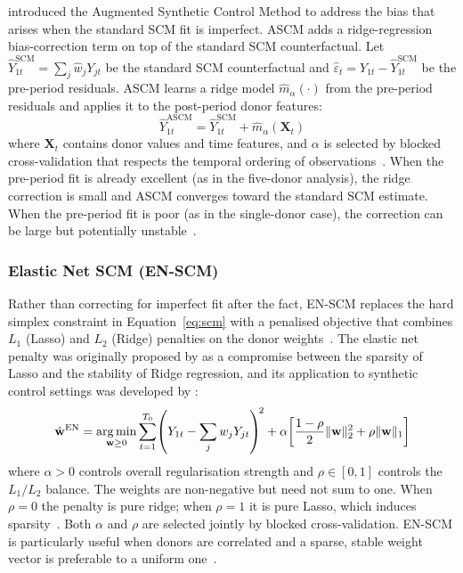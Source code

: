 \textcite{benmichael2021} introduced
the Augmented Synthetic Control Method to address the bias that arises
when the standard SCM fit is imperfect.
ASCM adds a ridge-regression bias-correction term on top of the
standard SCM counterfactual.
Let $\hat{Y}_{1t}^{\text{SCM}} = \sum_j \hat{w}_j Y_{jt}$ be the
standard SCM counterfactual and
$\hat{\varepsilon}_t = Y_{1t} - \hat{Y}_{1t}^{\text{SCM}}$
be the pre-period residuals.
ASCM learns a ridge model $\hat{m}_\alpha(\cdot)$ from the pre-period
residuals and applies it to the post-period donor features:
\begin{equation}
  \hat{Y}_{1t}^{\text{ASCM}} = \hat{Y}_{1t}^{\text{SCM}}
    + \hat{m}_\alpha\!\left(\mathbf{X}_t\right)
  \label{eq:ascm}
\end{equation}
where $\mathbf{X}_t$ contains donor values and time features, and
$\alpha$ is selected by blocked cross-validation that respects the
temporal ordering of observations~\parencite{benmichael2021}.
When the pre-period fit is already excellent (as in the five-donor
analysis), the ridge correction is small and ASCM converges toward
the standard SCM estimate.
When the pre-period fit is poor (as in the single-donor case), the
correction can be large but potentially unstable~\parencite{benmichael2021}.

\subsubsection{Elastic Net SCM (EN-SCM)}
\label{sec:enscm}

Rather than correcting for imperfect fit after the fact, EN-SCM
replaces the hard simplex constraint in Equation~\ref{eq:scm} with
a penalised objective that combines $L_1$ (Lasso) and $L_2$ (Ridge)
penalties on the donor weights~\parencite{hollingsworth2020}.
The elastic net penalty was originally proposed by
\textcite{zouelastic2005} as a compromise between the sparsity of Lasso
and the stability of Ridge regression, and its application to
synthetic control settings was developed by
\textcite{hollingsworth2020}:
\begin{equation}
  \hat{\mathbf{w}}^{\text{EN}} = \operatorname*{arg\,min}_{\mathbf{w} \geq 0}
  \sum_{t=1}^{T_0}\!\left(Y_{1t} - \sum_j w_j Y_{jt}\right)^{\!2}
  + \alpha\!\left[\frac{1-\rho}{2}\|\mathbf{w}\|_2^2
    + \rho\|\mathbf{w}\|_1\right]
  \label{eq:enscm}
\end{equation}
where $\alpha > 0$ controls overall regularisation strength and
$\rho \in [0,1]$ controls the $L_1/L_2$ balance.
The weights are non-negative but need not sum to one.
When $\rho = 0$ the penalty is pure ridge; when $\rho = 1$ it is
pure Lasso, which induces sparsity~\parencite{zouelastic2005}.
Both $\alpha$ and $\rho$ are selected jointly by blocked
cross-validation.
EN-SCM is particularly useful when donors are correlated and a sparse,
stable weight vector is preferable to a uniform
one~\parencite{hollingsworth2020}.

